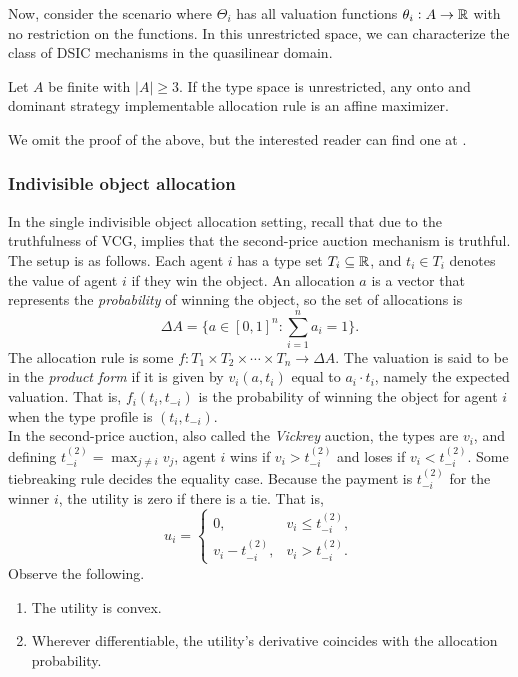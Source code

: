 		Now, consider the scenario where $\Theta_i$ has all valuation functions $\theta_i : A \to \mathbb{R}$ with no restriction on the functions. In this unrestricted space, we can characterize the class of DSIC mechanisms in the quasilinear domain.

		\begin{ftheo}[Roberts]
			Let $A$ be finite with $|A| \ge 3$. If the type space is unrestricted, any onto and dominant strategy implementable allocation rule is an affine maximizer.
		\end{ftheo}

		We omit the proof of the above, but the interested reader can find one at \cite{roberts}.

	\subsubsection{Indivisible object allocation}

		In the single indivisible object allocation setting, recall that due to the truthfulness of VCG,  implies that the second-price auction mechanism is truthful.\\

		The setup is as follows. Each agent $i$ has a type set $T_i \subseteq \mathbb{R}$, and $t_i \in T_i$ denotes the value of agent $i$ if they win the object. An allocation $a$ is a vector that represents the \emph{probability} of winning the object, so the set of allocations is
		\[ \Delta A = \{ a \in [0,1]^n : \sum_{i=1}^n a_i = 1 \}. \]
		The allocation rule is some $f : T_1 \times T_2 \times \cdots \times T_n \to \Delta A$. The valuation is said to be in the \emph{product form} if it is given by $v_i(a,t_i)$ equal to $a_i\cdot t_i$, namely the expected valuation. That is, $f_i(t_i,t_{-i})$ is the probability of winning the object for agent $i$ when the type profile is $(t_i,t_{-i})$.\\

		In the second-price auction, also called the \emph{Vickrey} auction, the types are $v_i$, and defining $t_{-i}^{(2)} = \max_{j \ne i} v_j$, agent $i$ wins if $v_i > t_{-i}^{(2)}$ and loses if $v_i < t_{-i}^{(2)}$. Some tiebreaking rule decides the equality case. Because the payment is $t_{-i}^{(2)}$ for the winner $i$, the utility is zero if there is a tie. That is,
		\[ u_i = \begin{cases} 0, & v_i \le t_{-i}^{(2)}, \\ v_i - t_{-i}^{(2)}, & v_i > t_{-i}^{(2)}. \end{cases} \]
		Observe the following.
		\begin{enumerate}
			\item The utility is convex.
			\item Wherever differentiable, the utility's derivative coincides with the allocation probability.
		\end{enumerate}

